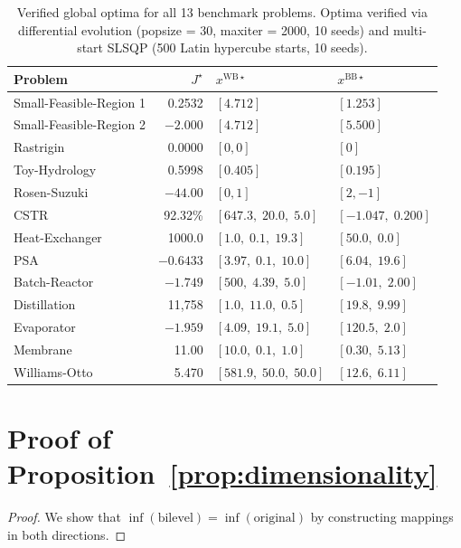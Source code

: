 \documentclass[12pt,a4paper]{article}%
\theoremstyle{plain}%
\theoremstyle{remark}%
\theoremstyle{definition}%
\def\WB{\mathrm{WB}}
\def\BB{\mathrm{BB}}
\begin{document}
\begin{appendices}
\begin{table}[htbp]
\centering
\caption{Verified global optima for all 13 benchmark problems. Optima verified via differential evolution (popsize = 30, maxiter = 2000, 10 seeds) and multi-start SLSQP (500 Latin hypercube starts, 10 seeds).}
\label{tab:verified_optima}
\begin{tabular}{@{}lrll@{}}
\toprule
\textbf{Problem} & $J^\star$ & $x^{\WB\star}$ & $x^{\BB\star}$ \\
\midrule
Small-Feasible-Region 1 & 0.2532 & $[4.712]$ & $[1.253]$ \\
Small-Feasible-Region 2 & $-2.000$ & $[4.712]$ & $[5.500]$ \\
Rastrigin & 0.0000 & $[0, 0]$ & $[0]$ \\
Toy-Hydrology & 0.5998 & $[0.405]$ & $[0.195]$ \\
Rosen-Suzuki & $-44.00$ & $[0, 1]$ & $[2, -1]$ \\
\midrule
CSTR & 92.32\% & $[647.3,\; 20.0,\; 5.0]$ & $[-1.047,\; 0.200]$ \\
Heat-Exchanger & 1000.0 & $[1.0,\; 0.1,\; 19.3]$ & $[50.0,\; 0.0]$ \\
PSA & $-0.6433$ & $[3.97,\; 0.1,\; 10.0]$ & $[6.04,\; 19.6]$ \\
Batch-Reactor & $-1.749$ & $[500,\; 4.39,\; 5.0]$ & $[-1.01,\; 2.00]$ \\
Distillation & 11{,}758 & $[1.0,\; 11.0,\; 0.5]$ & $[19.8,\; 9.99]$ \\
Evaporator & $-1.959$ & $[4.09,\; 19.1,\; 5.0]$ & $[120.5,\; 2.0]$ \\
Membrane & 11.00 & $[10.0,\; 0.1,\; 1.0]$ & $[0.30,\; 5.13]$ \\
Williams-Otto & 5.470 & $[581.9,\; 50.0,\; 50.0]$ & $[12.6,\; 6.11]$ \\
\bottomrule
\end{tabular}
\end{table}

\section{Proof of Proposition~\ref{prop:dimensionality}}\label{sec:proof_dimensionality}

\begin{proof}
We show that $\inf(\text{bilevel}) = \inf(\text{original})$ by constructing mappings in both directions.


\end{proof}
\end{appendices}
\end{document}
